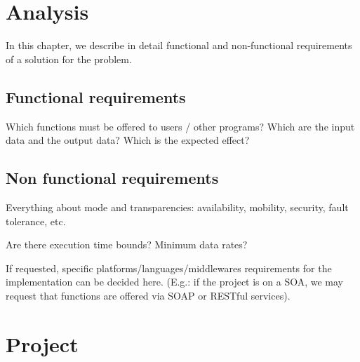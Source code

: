 \documentclass{memoir}
\begin{document}
\begin{comment}
In this chapter you describe the main problem, and an idea of the solution.
It is not necessary to be very detailed or formal, but it is important to explain which are the main aims and issues from the point of view of Distributed Systems:
\begin{itemize}
\item A description of the application.
\item The overall structure of the implementation: how resources are deployed, which are the players, the r\^oles.
\item The distributed system features (and the transparencies) and algorithms you intend to implement.
\item Your plan for testing the system.
\item A schedule for how you plan to carry our your design and implementation
\end{itemize}
\end{comment}


\chapter{Analysis}\label{ch:analysis}

In this chapter, we describe in detail functional and non-functional requirements of a solution for the problem.

\section{Functional requirements}
Which functions must be offered to users / other programs?  Which are the input data and the output data? Which is the expected effect? 

\section{Non functional requirements}
Everything about mode and transparencies: availability, mobility, security, fault tolerance, etc.

Are there execution time bounds? Minimum data rates?

If requested, specific platforms/languages/middlewares requirements for the implementation can be decided here. (E.g.: if the project is on a SOA, we may request that functions are offered via SOAP or RESTful services). 



\chapter{Project}
\end{document}
